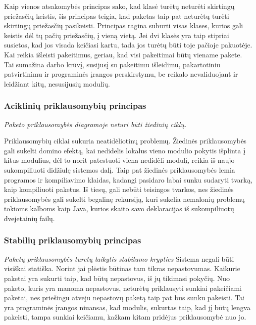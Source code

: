 Kaip vienos atsakomybės principas  sako, kad klasė turėtų neturėti skirtingų priežasčių keistis,
šis principas teigia, kad paketas taip pat neturėtų turėti skirtingų priežasčių pasikeisti.
Principas ragina suburti visas klases, kurios gali keistis dėl tų pačių priežasčių, į vieną vietą.
Jei dvi klasės yra taip stipriai susietos, kad jos visada keičiasi kartu, tada
jos turėtų būti toje pačioje pakuotėje.
Kai reikia išleisti pakeitimus, geriau, kad visi pakeitimai būtų viename pakete.
Tai sumažina darbo krūvį, susijusį su pakeitimu išleidimu, pakartotiniu patvirtinimu ir programinės įrangos perskirstymu,
be reikalo nevaliduojant ir leidžiant kitų, nesusijusių modulių\cite{AgileSoftwareDevelopment}.

\subsubsection{Aciklinių priklausomybių principas}
\textit{Paketo priklausomybės diagramoje neturi būti žiedinių ciklų.}

Priklausomybių ciklai sukuria neatidėliotinų problemų.
Žiedinės priklausomybės gali sukelti domino efektą, kai nedidelis lokalus vieno modulio pokytis išplinta į kitus modulius,
dėl to norit patestuoti viena nedidėli modulį, reikia iš naujo sukompiliuoti didžiulę sistemos dalį.
Taip pat žiedinės priklausomybės lemia programos ir kompiliavimo klaidas, kadangi pasidaro labai sunku sudaryti tvarką, kaip kompiliuoti paketus.
Iš tiesų, gali nebūti teisingos tvarkos, nes žiedinės priklausomybės gali sukelti begalinę rekursiją,
kuri sukelia nemalonių problemų tokioms kalboms kaip Java, kurios skaito savo deklaracijas iš
sukompiliuotų dvejetainių failų\cite{AgileSoftwareDevelopment}.


\subsubsection{Stabilių priklausomybių principas}
\textit{Paketų priklausomybės turetų laikytis stabilumo krypties}
Sistema negali būti visiškai statiška.
Norint jai plėstis būtinas tam tikras nepastovumas.
Kaikurie paketai yra sukurti taip, kad būtų nepastovus, iš jų tikimasi pokyčių.
Nuo paketo, kuris yra manoma nepastovus, neturėtų priklausyti sunkiai pakeičiami paketai,
nes priešingu atveju nepastovų paketą taip pat bus sunku pakeisti.
Tai yra programinės įrangos niuansas, kad modulis, sukurtas taip, kad jį būtų lengva pakeisti, tampa sunkiai keičiamu, kažkam
kitam pridėjus priklausomybė nuo jo\cite{AgileSoftwareDevelopment}.


